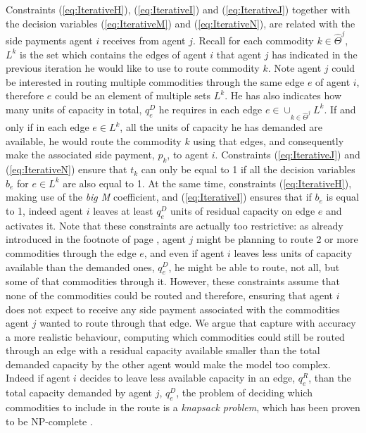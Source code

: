 \documentclass{article}
\begin{document}
Constraints (\ref{eq:IterativeH}),  (\ref{eq:IterativeI}) and (\ref{eq:IterativeJ}) together with the decision variables (\ref{eq:IterativeM}) and (\ref{eq:IterativeN}), are related with the side payments agent $i$ receives from agent $j$. Recall for each commodity $k\in \widehat{\Theta}^j$, $L^k$ is the set which contains the edges of agent $i$ that agent $j$ has indicated in the previous iteration he would like to use to route commodity $k$. Note agent $j$ could be interested in routing multiple commodities through the same edge $e$ of agent $i$, therefore $e$ could be an element of multiple sets $L^k$. He has also indicates how many units of capacity in total, $q_e^D$ he requires in each edge $e\in \cup_{k\in\widehat{\Theta}^j}L^k$. If and only if in each edge $e \in L^k$, all the units of capacity  he has demanded are available, he would route the commodity $k$ using that edges, and consequently make the associated side payment, $p_k$, to agent $i$. Constraints (\ref{eq:IterativeJ}) and (\ref{eq:IterativeN}) ensure that $t_k$ can only be equal to 1 if all the decision variables $b_e$ for $e \in L^k$ are also equal to 1. At the same time, constraints (\ref{eq:IterativeH}),  making use of the \emph{big M} coefficient, and (\ref{eq:IterativeI}) ensures that if $b_e$ is equal to 1, indeed agent $i$ leaves at least $q_e^D$ units of residual capacity on edge $e$ and activates it. Note that these constraints are actually too restrictive: as already introduced in the footnote of page \pageref{ft:sidepaymentexplanation}, agent $j$ might be planning to route 2 or more commodities through the edge $e$, and even if agent $i$ leaves less units of capacity available than the demanded ones, $q_e^D$, he might be able to route, not all, but some of that commodities through it. However, these constraints assume that none of the commodities could be routed and therefore, ensuring that  agent $i$ does not expect to receive any side payment associated with the commodities agent $j$ wanted to route through that edge. We argue that capture with accuracy a more realistic behaviour, computing which commodities could still be routed through an edge with a residual capacity available smaller than the total demanded capacity by the other agent would make the model too complex. Indeed if agent $i$ decides to leave less available capacity in an edge, $q_e^R$, than the total capacity demanded by agent $j$, $q_e^D$, the problem of deciding which commodities to include in the route is a \emph{knapsack problem}, which has been proven to be NP-complete \parencite{KARP1972}.
\end{document}
